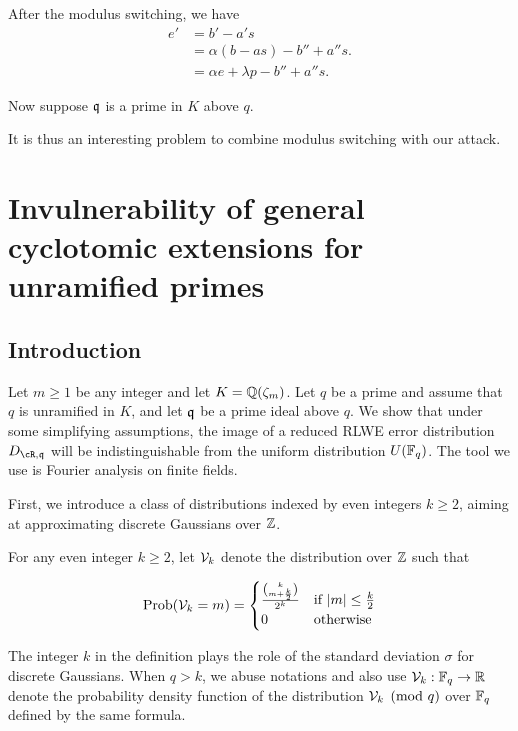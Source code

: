 \documentclass{amsart}
\begin{document}
After the modulus switching, we have
\begin{align*}
    e' &= b' - a's  \\
    &= \alpha(b-as) - b''  + a''s. \\
    & = \alpha e + \lambda p - b'' + a''s.
\end{align*}

Now suppose $\mathfrak{q}$ is a prime in $K$ above $q$.





It is thus an interesting problem to combine modulus switching with our attack.

\section{Invulnerability of general cyclotomic extensions for unramified primes}
\label{sec: cyclo-secure}

\subsection{Introduction}

Let $m \geq 1$ be any integer and let $K = \mathbb{Q}(\zeta_m)$. Let $q$ be a prime and assume that $q$ is unramified in $K$, and let $\mathfrak{q}$ be a prime ideal above $q$. We show that under some simplifying assumptions, the image of a reduced RLWE error distribution $D_{\cR,\fq}$ will be indistinguishable from the uniform distribution $U(\mathbb{F}_q)$. The tool we use is Fourier analysis on finite fields.

First, we introduce a class of distributions indexed by even integers $k \geq 2$, aiming at approximating discrete Gaussians over $\mathbb{Z}$.
\begin{Definition}
For any even integer $k \geq 2$, let $\mathcal{V}_k$ denote the distribution over $\mathbb{Z}$ such that

$$\operatorname{Prob}(\mathcal{V}_k = m) =  \begin{cases} \frac{{k \choose m+\frac{k}{2}}}{2^k} &\mbox{if } |m| \leq \frac{k}{2} \\
0 & \mbox{otherwise}  \end{cases}$$

\end{Definition}
The integer $k$ in the definition plays the role of the standard deviation $\sigma$ for discrete Gaussians. When $q > k$, we abuse notations and also use $\mathcal{V}_k: \mathbb{F}_q \to \mathbb{R}$ denote the probability density function of the distribution $\mathcal{V}_k \pmod {q}$ over $\mathbb{F}_q$ defined by the same formula.
\end{document}
